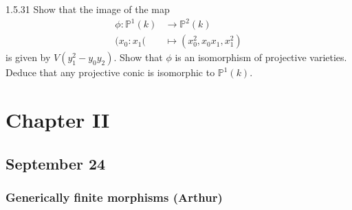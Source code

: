 \begin{manualexercise}{1.5.31}
	Show that the image of the map
	\begin{align*}
		\phi: \mathbb{P}^{1}(k) &\longrightarrow \mathbb{P}^{2}(k) \\
		(x_0:x_1( &\longmapsto (x_0^{2},x_0x_1,x_1^{2})
	\end{align*}
	is given by $V(y_1^{2}-y_0y_2)$. Show that $\phi$ is an isomorphism of projective varieties. Deduce that any projective conic is isomorphic to $\mathbb{P}^{1}(k)$.
\end{manualexercise}

\section{Chapter  II}

\subsection{September 24}

\subsubsection{Generically finite morphisms (Arthur)}

\begin{manualexercise}{2.37}
	
\end{manualexercise}

